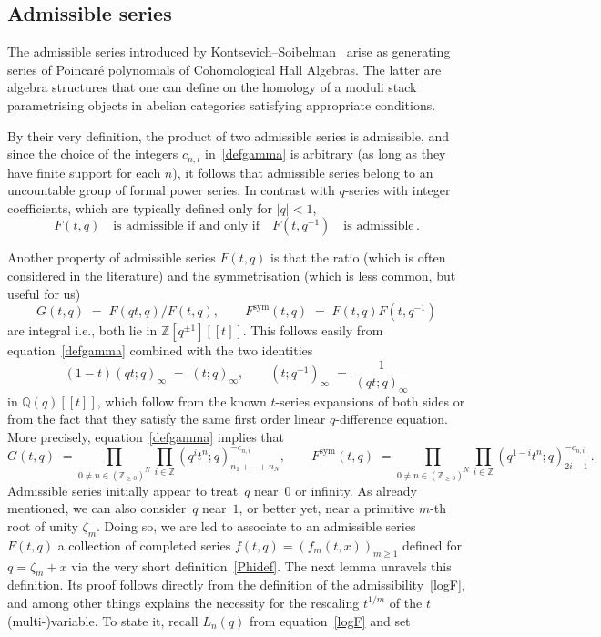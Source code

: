 \documentclass[12pt,reqno]{amsart}
\theoremstyle{definition}
\def\BZ{\mathbb Z}
\def\BQ{\mathbb Q}
\def\be{\begin{equation}}
\def\ee{\end{equation}}
\def\z{\zeta}
\def\={\;=\;}
\def\sym{\mathrm{sym}}
\def\Phitof{f}
\begin{document}
\subsection{Admissible series}
\label{sub.admissible}

The admissible series introduced by Kontsevich--Soibelman~\cite{KS:cohomological}
arise as generating series of Poincaré polynomials of Cohomological Hall Algebras.
The latter are algebra structures that one can define on the homology of a moduli
stack parametrising objects in abelian categories satisfying appropriate conditions.

By their very definition, the product of two admissible series is admissible, and
since the choice of the integers $c_{n,i}$ in~\eqref{defgamma} is arbitrary (as long
as they have finite support for each $n$), it follows that admissible series belong
to an uncountable group of formal power series. In contrast with $q$-series with
integer coefficients, which are typically defined only for $|q|<1$,
\be
\label{Fqqi}
F(t,q) \quad \text{is admissible if and only if} \quad F(t,q^{-1})
\quad \text{is admissible} \,.
\ee

Another property of admissible series $F(t,q)$ is that the ratio (which is often
considered in the literature) and the symmetrisation (which is less common, but
useful for us) 
\be
\label{GSdef}
G(t,q) \= F(qt,q)/F(t,q), \qquad F^\sym(t,q) \= F(t,q) F(t,q^{-1}) 
\ee
are integral i.e., both lie in $\BZ[q^{\pm 1}][\![t]\!]$. This follows easily
from equation~\eqref{defgamma} combined with the two identities
\be
(1-t)(q t;q)_\infty \= (t;q)_\infty, \qquad
(t;q^{-1})_\infty \= \frac{1}{(q t;q)_\infty}
\ee
in $\BQ(q)[\![t]\!]$, which follow from the known $t$-series expansions of both sides
or from the fact that they satisfy the same first order linear $q$-difference
equation. More precisely, equation~\eqref{defgamma} implies that
\be
\label{GS2}
G(t,q) \;=\!\! \prod_{0\neq n\in(\BZ_{\geq0})^N}
\prod_{i \in \BZ} (q^i t^n;q)_{n_1+\cdots+n_{N}}^{-c_{n,i}},
\qquad
F^\sym(t,q) \;=\!\! \prod_{0\neq n\in(\BZ_{\geq0})^N}
\prod_{i \in \BZ} (q^{1-i} t^n;q)_{2i-1}^{-c_{n,i}}
\,.
\ee
Admissible series initially appear to treat~$q$ near~$0$ or infinity. As already
mentioned, we can also
consider~$q$ near~$1$, or better yet, near a primitive $m$-th root of unity $\z_m$. 
Doing so, we are led to associate to an admissible series $F(t,q)$ a collection of
completed series $\Phitof(t,q)=(\Phitof_m(t,x))_{m \geq 1}$ defined for $q=\z_m+x$
via the very short definition~\eqref{Phidef}. 
The next lemma unravels this definition. Its proof follows directly from the
definition of the admissibility~\eqref{logF}, and among other things
explains the necessity for the rescaling $t^{1/m}$ of the $t$ (multi-)variable.
To state it, recall $L_{n}(q)$ from equation~\eqref{logF} and set
\end{document}
